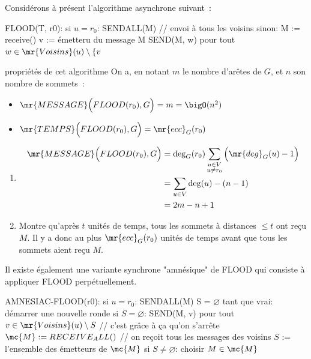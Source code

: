 Considérons à présent l'algorithme asynchrone suivant~:
\begin{lstLNat}
  FLOOD(T, r0):
    si $u = r_0$:
      SENDALL(M) // envoi à tous les voisins
    sinon:
      M := receive()
      v := émetteru du message M
      SEND(M, w) pour tout $w \in \mr{Voisins}(u) \setminus \{v$
\end{lstLNat}
\begin{proposition}{}{propriétés de cet algorithme}
  On a, en notant $m$ le nombre d'arêtes de $G$, et $n$ son nombre de sommets~:
  \begin{itemize}
    \item $\mr{MESSAGE}\Big(FLOOD(r_0),G\Big) = m = \bigO(n^2)$
    \item $\mr{TEMPS}\Big(FLOOD(r_0),G\Big) = \mr{ecc}_G(r_0)$
  \end{itemize}
\end{proposition}
\begin{demonstration}
  \begin{enumerate}
    \item\begin{align*}
        \mr{MESSAGE}\Big(FLOOD(r_0),G\Big) &= \deg_G(r_0) \sum_{\substack{u \in V\\ u \neq r_0}}\Big(\mr{deg}_G(u) - 1\Big) \\
        &= \sum_{u \in V} \deg(u) - (n-1) \\
        &= 2m - n +1
      \end{align*}
    \item Montre qu'après $t$ unités de temps, tous les sommets à distances $\leq t$ ont reçu $M$. Il y a donc au plus $\mr{ecc}_G(r_0)$ unités de temps avant que tous les sommets aient reçu $M$. 
  \end{enumerate}
\end{demonstration}


Il existe également une variante synchrone "amnésique" de FLOOD qui consiste à appliquer FLOOD perpétuellement.
\begin{lstLNat}
  AMNESIAC-FLOOD(r0):
  si $u=r_0$:
    SENDALL(M)
  S = $\varnothing$
  tant que vrai:
    démarrer une nouvelle ronde
    si $S = \varnothing$:
      SEND(M, v) pour tout $v \in \mr{Voisins}(u)\setminus S$
      // c'est grâce à ça qu'on s'arrête
      $\mc{M} := RECEIVE_ALL()$ // on reçoit tous les messages des voisins
      $S$ := l'ensemble des émetteurs de $\mc{M}$
      si $S \neq \varnothing$:
        choisir $M \in \mc{M}$
\end{lstLNat}

